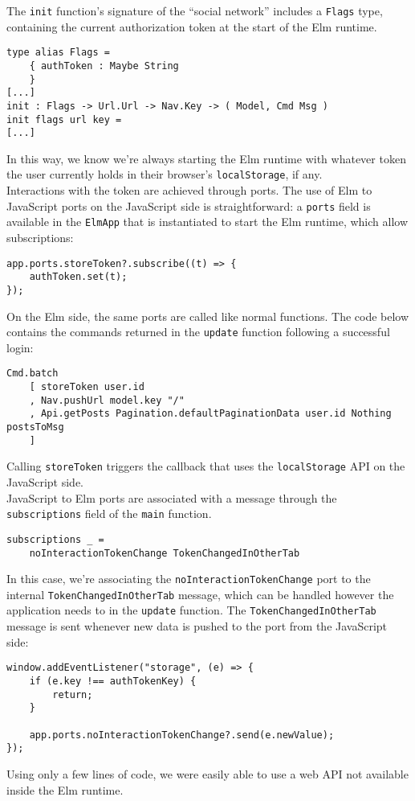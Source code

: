 The \texttt{init} function's signature of the ``social network'' includes a \texttt{Flags} type, containing the current authorization token at the start of the Elm runtime. 
\begin{verbatim}
type alias Flags =
    { authToken : Maybe String
    }
[...]
init : Flags -> Url.Url -> Nav.Key -> ( Model, Cmd Msg )
init flags url key =
[...]
\end{verbatim}

In this way, we know we're always starting the Elm runtime with whatever token the user currently holds in their browser's \texttt{localStorage}, if any.\\

Interactions with the token are achieved through ports. The use of Elm to JavaScript ports on the JavaScript side is straightforward: a \texttt{ports} field is available in the \texttt{ElmApp} that is instantiated to start the Elm runtime, which allow subscriptions:
\begin{verbatim}
app.ports.storeToken?.subscribe((t) => {
    authToken.set(t);
});
\end{verbatim}
On the Elm side, the same ports are called like normal functions. The code below contains the commands returned in the \texttt{update} function following a successful login:
\begin{verbatim}
Cmd.batch
    [ storeToken user.id
    , Nav.pushUrl model.key "/"
    , Api.getPosts Pagination.defaultPaginationData user.id Nothing postsToMsg
    ]
\end{verbatim}
Calling \texttt{storeToken} triggers the callback that uses the \texttt{localStorage} API on the JavaScript side.\\

JavaScript to Elm ports are associated with a message through the \texttt{subscriptions} field of the \texttt{main} function.
\begin{verbatim}
subscriptions _ =
    noInteractionTokenChange TokenChangedInOtherTab
\end{verbatim}
In this case, we're associating the \texttt{noInteractionTokenChange} port to the internal \texttt{TokenChangedInOtherTab} message, which can be handled however the application needs to in the \texttt{update} function. The \texttt{TokenChangedInOtherTab} message is sent whenever new data is pushed to the port from the JavaScript side:
\begin{verbatim}
window.addEventListener("storage", (e) => {
    if (e.key !== authTokenKey) {
        return;
    }

    app.ports.noInteractionTokenChange?.send(e.newValue);
});
\end{verbatim}
Using only a few lines of code, we were easily able to use a web API not available inside the Elm runtime.


